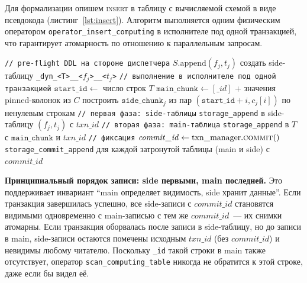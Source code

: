 Для формализации опишем \textsc{insert} в таблицу с вычисляемой
схемой в виде псевдокода (листинг~\ref{lst:insert}). Алгоритм
выполняется одним физическим оператором
\texttt{operator\_insert\_computing} в исполнителе под одной
транзакцией, что гарантирует атомарность по отношению к
параллельным запросам.

\begin{algorithm}[!h]
\caption{Алгоритм \textsc{insert} в таблицу с вычисляемой схемой}
\label{lst:insert}
\begin{algorithmic}
    \State \texttt{// pre-flight DDL на стороне диспетчера}
      \State $S.\mathrm{append}(f_j, t_j)$
        \State создать side-таблицу
          \texttt{\_dyn\_<T>\_\_<$f_j$>\_\_<$t_j$>}
      \EndIf
    \EndFor
    \State \texttt{// выполнение в исполнителе под одной транзакцией}
    \State $\mathtt{start\_id} \gets$ число строк $T$
    \State $\mathtt{main\_chunk} \gets [\_id]$ + значения
      pinned-колонок из $C$
      \State построить $\mathtt{side\_chunk}_j$ из пар
        $(\mathtt{start\_id}+i, c_j[i])$ по ненулевым строкам
    \EndFor
    \State \texttt{// первая фаза: side-таблицы}
      \State \texttt{storage\_append} в side-таблицу
        $(f_j, t_j)$ с $\mathit{txn\_id}$
    \EndFor
    \State \texttt{// вторая фаза: main-таблица}
    \State \texttt{storage\_append} в $T$ с
      $\mathtt{main\_chunk}$ и $\mathit{txn\_id}$
    \State \texttt{// фиксация}
    \State $\mathit{commit\_id} \gets
      \mathrm{txn\_manager}.\textsc{commit}()$
    \State \texttt{storage\_commit\_append} для каждой
      затронутой таблицы (main и side) с $\mathit{commit\_id}$
  \EndFunction
\end{algorithmic}
\end{algorithm}

\textbf{Принципиальный порядок записи: side первыми, main
последней.} Это поддерживает инвариант ``main определяет
видимость, side хранит данные''. Если транзакция завершилась
успешно, все side-записи с $\mathit{commit\_id}$ становятся видимыми
одновременно с main-записью с тем же $\mathit{commit\_id}$~--- их
снимки атомарны. Если транзакция оборвалась после записи в
side-таблицу, но до записи в main, side-записи остаются помечены
исходным $\mathit{txn\_id}$ (без $\mathit{commit\_id}$) и невидимы
любому читателю. Поскольку \texttt{\_id} такой строки в main также
отсутствует, оператор \texttt{scan\_computing\_table} никогда не
обратится к этой строке, даже если бы видел её.


